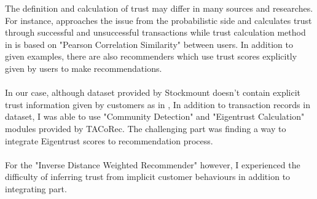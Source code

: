 The definition and calculation of trust may differ in many sources and researches. For instance, \cite{Eigentrust} approaches the issue from the probabilistic side and calculates trust through successful and unsuccessful transactions while trust calculation method in \cite{papagelis_article} is based on "Pearson Correlation Similarity" between users. In addition to given examples, there are also recommenders\cite{massa_article} which use trust scores explicitly given by users to make recommendations. \\ \\
In our case, although dataset provided by Stockmount doesn't contain explicit trust information given by customers as in \cite{massa_article}, In addition to transaction records in dataset, I was able to use "Community Detection" and "Eigentrust Calculation" modules provided by TACoRec\cite{Tacorec}. The challenging part was finding a way to integrate Eigentrust scores to recommendation process. \\ \\
For the "Inverse Distance Weighted Recommender" however, I experienced the difficulty of inferring trust from implicit customer behaviours in addition to integrating part. 